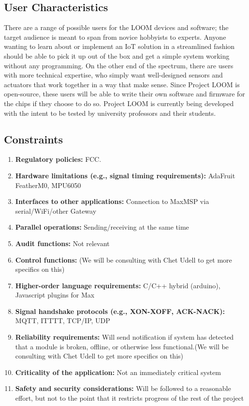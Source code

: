 \documentclass[onecolumn, draftclsnofoot,10pt, compsoc]{IEEEtran}
\begin{document}
	\subsection{User Characteristics}
	There are a range of possible users for the LOOM devices and software; the target audience is meant to span from novice hobbyists to experts. Anyone wanting to learn about or implement an IoT solution in a streamlined fashion should be able to pick it up out of the box and get a simple system working without any programming. On the other end of the spectrum, there are users with more technical expertise, who simply want well-designed sensors and actuators that work together in a way that make sense. Since Project LOOM is open-source, these users will be able to write their own software and firmware for the chips if they choose to do so.
	Project LOOM is currently being developed with the intent to be tested by university professors and their students.

	\subsection{Constraints}
		\begin{enumerate}
			\item \textbf{Regulatory policies:} FCC.
			\item \textbf{Hardware limitations (e.g., signal timing requirements):} AdaFruit FeatherM0, MPU6050
			\item \textbf{Interfaces to other applications:} Connection to MaxMSP via serial/WiFi/other Gateway
			\item \textbf{Parallel operations:} Sending/receiving at the same time
			\item \textbf{Audit functions:} Not relevant
			\item \textbf{Control functions:} (We will be consulting with Chet Udell to get more specifics on this)
			\item \textbf{Higher-order language requirements:} C/C++ hybrid (arduino), Javascript plugins for Max
			\item \textbf{Signal handshake protocols (e.g., XON-XOFF, ACK-NACK):} MQTT, ITTTT, TCP/IP, UDP
			\item \textbf{Reliability requirements:} Will send notification if system has detected that a module is broken, offline, or otherwise less functional.(We will be consulting with Chet Udell to get more specifics on this)
			\item \textbf{Criticality of the application:} Not an immediately critical system
			\item \textbf{Safety and security considerations:} Will be followed to a reasonable effort, but not to the point that it restricts progress of the rest of the project
		\end{enumerate}
\end{document}
